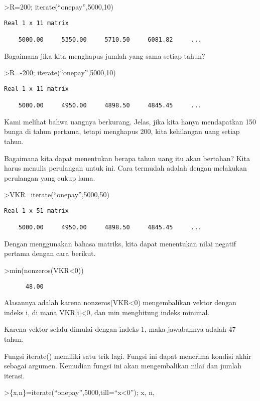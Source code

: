 \documentclass[
]{book}
\begin{document}
\textgreater R=200; iterate(``onepay'',5000,10)

\begin{verbatim}
Real 1 x 11 matrix

    5000.00     5350.00     5710.50     6081.82     ...
\end{verbatim}

Bagaimana jika kita menghapus jumlah yang sama setiap tahun?

\textgreater R=-200; iterate(``onepay'',5000,10)

\begin{verbatim}
Real 1 x 11 matrix

    5000.00     4950.00     4898.50     4845.45     ...
\end{verbatim}

Kami melihat bahwa uangnya berkurang. Jelas, jika kita hanya mendapatkan 150 bunga di tahun pertama, tetapi menghapus 200, kita kehilangan uang setiap tahun.

Bagaimana kita dapat menentukan berapa tahun uang itu akan bertahan? Kita harus menulis perulangan untuk ini. Cara termudah adalah dengan melakukan perulangan yang cukup lama.

\textgreater VKR=iterate(``onepay'',5000,50)

\begin{verbatim}
Real 1 x 51 matrix

    5000.00     4950.00     4898.50     4845.45     ...
\end{verbatim}

Dengan menggunakan bahasa matriks, kita dapat menentukan nilai negatif pertama dengan cara berikut.

\textgreater min(nonzeros(VKR\textless0))

\begin{verbatim}
      48.00 
\end{verbatim}

Alasannya adalah karena nonzeros(VKR\textless0) mengembalikan vektor dengan indeks i, di mana VKR{[}i{]}\textless0, dan min menghitung indeks minimal.

Karena vektor selalu dimulai dengan indeks 1, maka jawabannya adalah 47 tahun.

Fungsi iterate() memiliki satu trik lagi. Fungsi ini dapat menerima kondisi akhir sebagai argumen. Kemudian fungsi ini akan mengembalikan nilai dan jumlah iterasi.

\textgreater\{x,n\}=iterate(``onepay'',5000,till=``x\textless0''); x, n,
\end{document}

